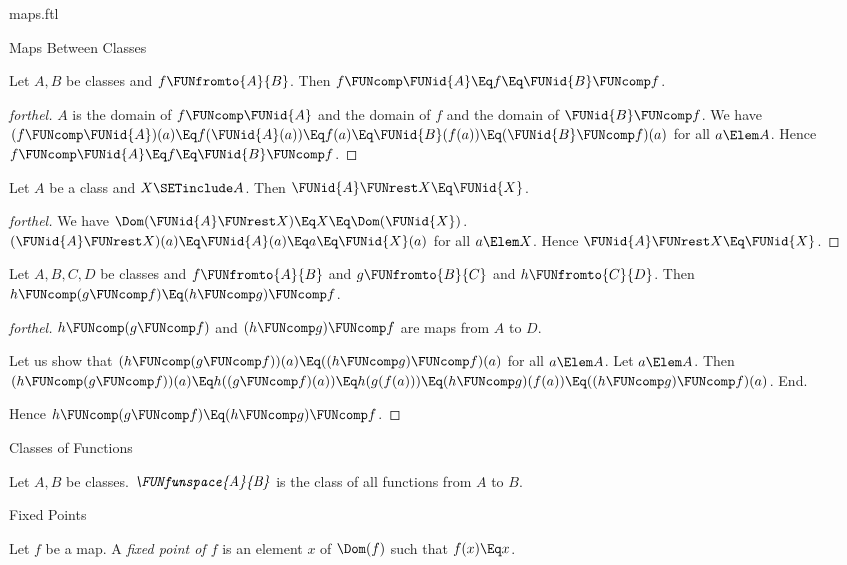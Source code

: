\documentclass{stex}
\begin{document}
\begin{smodule}{maps.ftl}
\begin{sfragment}{Maps Between Classes}
  \begin{proposition}[forthel]
    Let $A, B$ be classes and $f \FUNfromto{A}{B}$.
    Then $f \FUNcomp \FUNid{A} \Eq f \Eq \FUNid{B} \FUNcomp f$.
  \end{proposition}
  \begin{proof}[forthel]
    $A$ is the domain of $f \FUNcomp \FUNid{A}$ and the domain of $f$ and the domain of $\FUNid{B} \FUNcomp f$.
    We have $(f \FUNcomp \FUNid{A})(a)
      \Eq f(\FUNid{A}(a))
      \Eq f(a)
      \Eq \FUNid{B}(f(a))
      \Eq (\FUNid{B} \FUNcomp f)(a)$
    for all $a \Elem A$.
    Hence $f \FUNcomp \FUNid{A}
      \Eq f
      \Eq \FUNid{B} \FUNcomp f$.
  \end{proof}

  \begin{proposition}[forthel]
    Let $A$ be a class and $X \SETinclude A$.
    Then $\FUNid{A} \FUNrest X \Eq \FUNid{X}$.
  \end{proposition}
  \begin{proof}[forthel]
    We have $\Dom(\FUNid{A} \FUNrest X)
      \Eq X
      \Eq \Dom(\FUNid{X})$.
    $(\FUNid{A} \FUNrest X)(a)
      \Eq \FUNid{A}(a)
      \Eq a
      \Eq \FUNid{X}(a)$
    for all $a \Elem X$.
    Hence $\FUNid{A} \FUNrest X \Eq \FUNid{X}$.
  \end{proof}

  \begin{proposition}[forthel]
    Let $A, B, C, D$ be classes and $f \FUNfromto{A}{B}$ and $g \FUNfromto{B}{C}$ and $h \FUNfromto{C}{D}$.
    Then $h \FUNcomp (g \FUNcomp f) \Eq (h \FUNcomp g) \FUNcomp f$.
  \end{proposition}
  \begin{proof}[forthel]
    $h \FUNcomp (g \FUNcomp f)$ and $(h \FUNcomp g) \FUNcomp f$ are maps from $A$ to $D$.

    Let us show that $(h \FUNcomp (g \FUNcomp f))(a) \Eq ((h \FUNcomp g) \FUNcomp f)(a)$ for all $a \Elem A$.
      Let $a \Elem A$.
      Then $(h \FUNcomp (g \FUNcomp f))(a)
        \Eq h((g \FUNcomp f)(a))
        \Eq h(g(f(a)))
        \Eq (h \FUNcomp g)(f(a))
        \Eq ((h \FUNcomp g) \FUNcomp f)(a)$.
    End.

    Hence $h \FUNcomp (g \FUNcomp f) \Eq (h \FUNcomp g) \FUNcomp f$.
  \end{proof}
\end{sfragment}

\begin{sfragment}{Classes of Functions}
  \begin{definition}[forthel,for=FUNfunspace]
    Let $A, B$ be classes.
    $\emph{\FUNfunspace{A}{B}}$ is the class of all functions from $A$ to $B$.
  \end{definition}
\end{sfragment}

\begin{sfragment}{Fixed Points}
  \begin{definition}[forthel,for=fixed point]
    Let $f$ be a map.
    A \emph{fixed point of $f$} is an element $x$ of $\Dom(f)$ such that $f(x) \Eq x$.
  \end{definition}
\end{sfragment}
\end{smodule}
\end{document}
